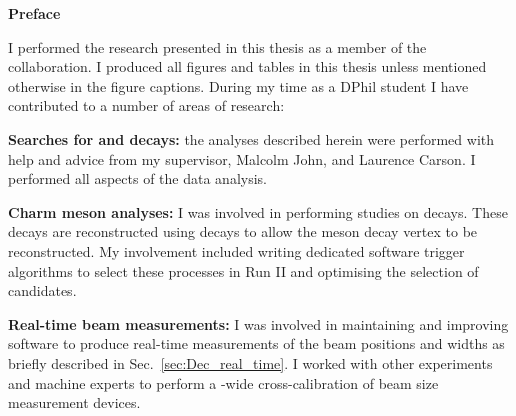 \begin{alwayssingle} 
 \thispagestyle{empty}
 \begin{center}
   \vspace*{1.5cm}
   {\Large \bfseries  Preface}
 \end{center}
 \vspace{0.5cm}
 I performed the research presented in this thesis as a member of the \lhcb collaboration. I produced all figures and tables in this thesis unless mentioned otherwise in the figure captions.  
During my time as a DPhil student I have contributed to a number of areas of research: 
 \begin{description}
 \item \textbf{Searches for \decay{\Bp}{\Dsp\phiz} and \decay{\Bp}{\Dsp\Kp\Km} decays:} the analyses described herein were performed with help and advice from my supervisor, Malcolm John, and Laurence Carson. I performed all aspects of the data analysis. 

 \item \textbf{Charm meson analyses:} I was involved in performing studies on \decay{\Dp}{\pip\piz} decays. These decays are reconstructed using \decay{\piz}{\ep\en\Pgamma} decays to allow the \Dp meson decay vertex to be reconstructed. My involvement included writing dedicated software trigger algorithms to select these processes in Run II and optimising the selection of candidates.  

 \item \textbf{Real-time beam measurements:} I was involved in maintaining and improving software to produce real-time measurements of the \lhc beam positions and widths as briefly described in Sec.~\ref{sec:Dec_real_time}. I worked with other experiments and \lhc machine experts to perform a \lhc-wide cross-calibration of beam size measurement devices.  


 \end{description}

\end{alwayssingle}



